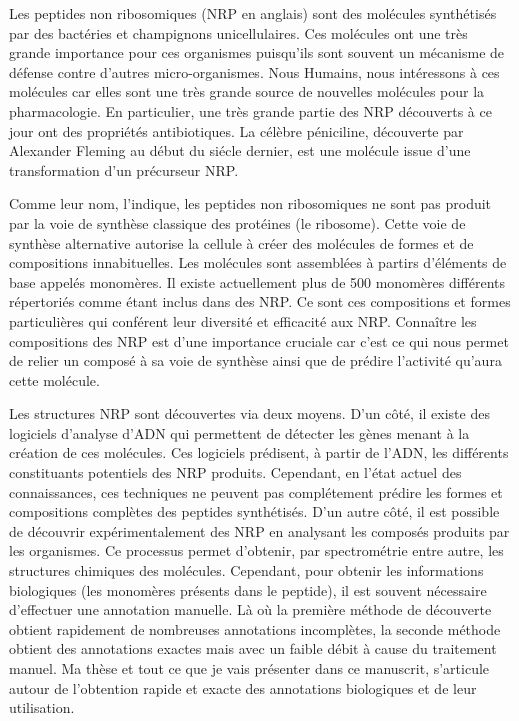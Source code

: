 Les peptides non ribosomiques (NRP en anglais) sont des molécules synthétisés par des bactéries et champignons unicellulaires.
Ces molécules ont une très grande importance pour ces organismes puisqu'ils sont souvent un mécanisme de défense contre d'autres micro-organismes.
Nous Humains, nous intéressons à ces molécules car elles sont une très grande source de nouvelles molécules pour la pharmacologie.
En particulier, une très grande partie des NRP découverts à ce jour ont des propriétés antibiotiques.
La célèbre péniciline, découverte par Alexander Fleming au début du siécle dernier, est une molécule issue d'une transformation d'un précurseur NRP.

Comme leur nom, l'indique, les peptides non ribosomiques ne sont pas produit par la voie de synthèse classique des protéines (le ribosome).
Cette voie de synthèse alternative autorise la cellule à créer des molécules de formes et de compositions innabituelles.
Les molécules sont assemblées à partirs d'éléments de base appelés monomères.
Il existe actuellement plus de 500 monomères différents répertoriés comme étant inclus dans des NRP.
Ce sont ces compositions et formes particulières qui conférent leur diversité et efficacité aux NRP.
Connaître les compositions des NRP est d'une importance cruciale car c'est ce qui nous permet de relier un composé à sa voie de synthèse ainsi que de prédire l'activité qu'aura cette molécule.

Les structures NRP sont découvertes via deux moyens.
D'un côté, il existe des logiciels d'analyse d'ADN qui permettent de détecter les gènes menant à la création de ces molécules.
Ces logiciels prédisent, à partir de l'ADN, les différents constituants potentiels des NRP produits.
Cependant, en l'état actuel des connaissances, ces techniques ne peuvent pas complétement prédire les formes et compositions complètes des peptides synthétisés.
D'un autre côté, il est possible de découvrir expérimentalement des NRP en analysant les composés produits par les organismes.
Ce processus permet d'obtenir, par spectrométrie entre autre, les structures chimiques des molécules.
Cependant, pour obtenir les informations biologiques (les monomères présents dans le peptide), il est souvent nécessaire d'effectuer une annotation manuelle.
Là où la première méthode de découverte obtient rapidement de nombreuses annotations incomplètes, la seconde méthode obtient des annotations exactes mais avec un faible débit à cause du traitement manuel.
Ma thèse et tout ce que je vais présenter dans ce manuscrit, s'articule autour de l'obtention rapide et exacte des annotations biologiques et de leur utilisation.

